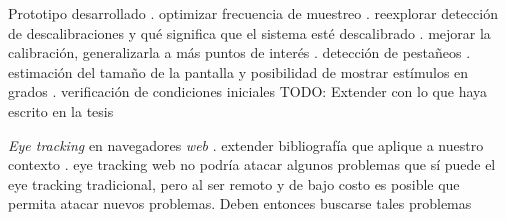 \documentclass{beamer}
\begin{document}
\begin{frame}{Prototipo desarrollado}
. optimizar frecuencia de muestreo
. reexplorar detección de descalibraciones y qué significa que el sistema esté
  descalibrado
. mejorar la calibración, generalizarla a más puntos de interés
. detección de pestañeos
. estimación del tamaño de la pantalla y posibilidad de mostrar estímulos en
  grados
. verificación de condiciones iniciales
TODO: Extender con lo que haya escrito en la tesis
\end{frame}

\begin{frame}{\textit{Eye tracking} en navegadores \textit{web}}
. extender bibliografía que aplique a nuestro contexto
. eye tracking web no podría atacar algunos problemas que sí puede el eye
  tracking tradicional, pero al ser remoto y de bajo costo es posible que
  permita atacar nuevos problemas. Deben entonces buscarse tales problemas
\end{frame}
\end{document}
